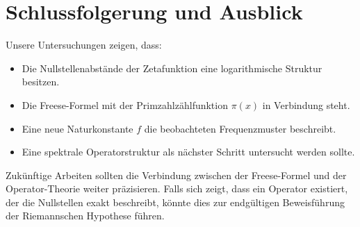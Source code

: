 \documentclass[a4paper,12pt]{article}
\begin{document}
\section{Schlussfolgerung und Ausblick}
Unsere Untersuchungen zeigen, dass:
\begin{itemize}
    \item Die Nullstellenabstände der Zetafunktion eine logarithmische Struktur besitzen.
    \item Die Freese-Formel mit der Primzahlzählfunktion $\pi(x)$ in Verbindung steht.
    \item Eine neue Naturkonstante $f$ die beobachteten Frequenzmuster beschreibt.
    \item Eine spektrale Operatorstruktur als nächster Schritt untersucht werden sollte.
\end{itemize}
Zukünftige Arbeiten sollten die Verbindung zwischen der Freese-Formel und der Operator-Theorie weiter präzisieren. Falls sich zeigt, dass ein Operator existiert, der die Nullstellen exakt beschreibt, könnte dies zur endgültigen Beweisführung der Riemannschen Hypothese führen.
\end{document}
